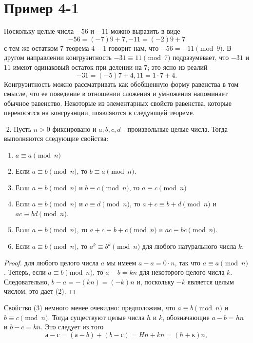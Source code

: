 \documentclass[11pt]{article}
\begin{document}
	\section{Пример 4-1}
	Поскольку целые числа $-56$ и $-11$ можно выразить в виде
	\[
		-56 = (- 7) 9 + 7, -11 = (- 2) 9 + 7
	\]
	с тем же остатком $7$ теорема $4-1$ говорит нам, что $-56 = -11 \pmod{9}$. В другом направлении конгруэнтность $-31 \equiv 11 \pmod{7}$ подразумевает, что $-31$ и $11$ имеют одинаковый остаток при делении на $7$; это ясно из реалий
	\[
		-31 = (-5) 7 + 4, 11 = 1 \cdot 7 + 4.
	\]
	Конгруэнтность можно рассматривать как обобщенную форму равенства в том смысле, что ее поведение в отношении сложения и умножения напоминает обычное равенство. Некоторые из элементарных свойств равенства, которые переносятся на конгруэнции, появляются в следующей теореме.
	\begin{enumerate}
		-2. Пусть $n> 0$ фиксировано и $a, b, c, d$ - произвольные целые числа. Тогда выполняются следующие свойства:
		
	\end{enumerate}
	\begin{enumerate}
		\item $a \equiv a \pmod{n}$
		\item Если $a \equiv b \pmod{n}$, то $b \equiv a \pmod{n}$.
		\item Если $a \equiv b \pmod{n}$ и $b \equiv c \pmod{n}$, то $a \equiv c \pmod{n}$
		\item Если $a \equiv b \pmod{n}$ и $c \equiv d \pmod{n}$, то $a + c \equiv b + d \pmod{n}$ и $ac \equiv bd \pmod{n}$.
		\item Если $a \equiv b \pmod{n}$, то $a + c \equiv b + c \pmod{n}$ и $ac \equiv bc \pmod{n}$.
		\item Если $a \equiv b \pmod{n}$, то $a^{k} \equiv b^{k} \pmod{n}$ для любого натурального числа $k$.
	\end{enumerate}
	\begin{proof}
		 для любого целого числа $a$ мы имеем $a-a = 0 \cdot n$, так что $a \equiv a \pmod{n}$. Теперь, если $a \equiv b \pmod{n}$, то $a-b = kn$ для некоторого целого числа $k$. Следовательно, $b-a = - (kn) = (- k) n$ и, поскольку $-k$ является целым числом, это дает (2).
	\end{proof}
	
	Свойство (3) немного менее очевидно: предположим, что $a \equiv b \pmod{n}$ и $b \equiv c \pmod{n}$. Тогда существуют целые числа $h$ и $k$, обозначающие $a-b = hn$ и $b-c = kn$. Это следует из того
	\[
		а-с = (а-b) + (b-с) = Hn + kn = (h + к) n,
	\]
	
\end{document}
